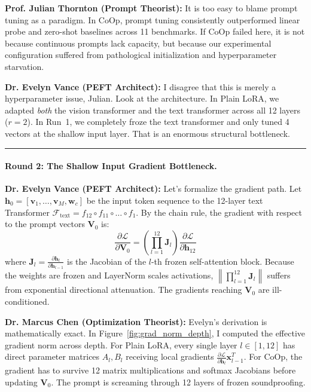 \documentclass[letterpaper,11pt,leqno]{article}
\newcommand{\speakerVance}[1]{\noindent\textbf{\color{purple!80!black}Dr. Evelyn Vance (PEFT Architect):} #1\vspace{0.4em}}
\newcommand{\speakerThornton}[1]{\noindent\textbf{\color{blue!70!black}Prof. Julian Thornton (Prompt Theorist):} #1\vspace{0.4em}}
\newcommand{\speakerChen}[1]{\noindent\textbf{\color{green!60!black}Dr. Marcus Chen (Optimization Theorist):} #1\vspace{0.4em}}
\begin{document}
\speakerThornton{It is too easy to blame prompt tuning as a paradigm. In CoOp, prompt tuning consistently outperformed linear probe and zero-shot baselines across 11 benchmarks. If CoOp failed here, it is not because continuous prompts lack capacity, but because our experimental configuration suffered from pathological initialization and hyperparameter starvation.}

\speakerVance{I disagree that this is merely a hyperparameter issue, Julian. Look at the architecture. In Plain LoRA, we adapted \textit{both} the vision transformer and the text transformer across all 12 layers ($r=2$). In Run~1, we completely froze the text transformer and only tuned 4 vectors at the shallow input layer. That is an enormous structural bottleneck.}

\vspace{0.8em}\hrule\vspace{0.8em}

\paragraph{Round 2: The Shallow Input Gradient Bottleneck.}
\speakerVance{Let's formalize the gradient path. Let $\mathbf{h}_0 = [\mathbf{v}_1, \dots, \mathbf{v}_M, \mathbf{w}_c]$ be the input token sequence to the 12-layer text Transformer $\mathcal{F}_\mathrm{text} = f_{12} \circ f_{11} \circ \dots \circ f_1$. By the chain rule, the gradient with respect to the prompt vectors $\mathbf{V}_0$ is:
\begin{equation}
    \frac{\partial \mathcal{L}}{\partial \mathbf{V}_0} = \left( \prod_{l=1}^{12} \mathbf{J}_l \right) \frac{\partial \mathcal{L}}{\partial \mathbf{h}_{12}}
\end{equation}
where $\mathbf{J}_l = \frac{\partial \mathbf{h}_l}{\partial \mathbf{h}_{l-1}}$ is the Jacobian of the $l$-th frozen self-attention block. Because the weights are frozen and LayerNorm scales activations, $\left\|\prod_{l=1}^{12} \mathbf{J}_l\right\|$ suffers from exponential directional attenuation. The gradients reaching $\mathbf{V}_0$ are ill-conditioned.}

\speakerChen{Evelyn's derivation is mathematically exact. In Figure~\ref{fig:grad_norm_depth}, I computed the effective gradient norm across depth. For Plain LoRA, every single layer $l \in [1, 12]$ has direct parameter matrices $A_l, B_l$ receiving local gradients $\frac{\partial \mathcal{L}}{\partial \mathbf{h}_l} \mathbf{x}_{l-1}^T$. For CoOp, the gradient has to survive 12 matrix multiplications and softmax Jacobians before updating $\mathbf{V}_0$. The prompt is screaming through 12 layers of frozen soundproofing.}
\end{document}
